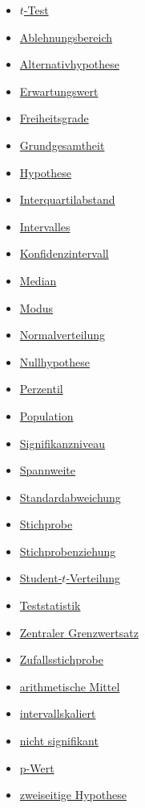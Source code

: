 \documentclass[
]{book}
\providecommand{\tightlist}{%
  \setlength{\itemsep}{0pt}\setlength{\parskip}{0pt}}
\theoremstyle{definition}
\theoremstyle{definition}
\theoremstyle{definition}
\theoremstyle{definition}
\theoremstyle{remark}
\begin{document}
\begin{itemize}
\tightlist
\item
  \hyperref[customdef-t-test]{\(t\)-Test}
\item
  \hyperref[customdef-ablehnungsbereich]{Ablehnungsbereich}
\item
  \hyperref[customdef-alternativhypothese]{Alternativhypothese}
\item
  \hyperref[customdef-erwartungswert]{Erwartungswert}
\item
  \hyperref[customdef-freiheitsgrade]{Freiheitsgrade}
\item
  \hyperref[customdef-grundgesamtheit]{Grundgesamtheit}
\item
  \hyperref[customdef-hypothese]{Hypothese}
\item
  \hyperref[customdef-iqr]{Interquartilabstand}
\item
  \hyperref[customdef-interval]{Intervalles}
\item
  \hyperref[customdef-confidence-interval]{Konfidenzintervall}
\item
  \hyperref[customdef-median]{Median}
\item
  \hyperref[customdef-modus]{Modus}
\item
  \hyperref[customdef-normalverteilung]{Normalverteilung}
\item
  \hyperref[customdef-nullhypothese]{Nullhypothese}
\item
  \hyperref[customdef-perzentil]{Perzentil}
\item
  \hyperref[customdef-population]{Population}
\item
  \hyperref[customdef-signifikanzniveau]{Signifikanzniveau}
\item
  \hyperref[customdef-spannweite]{Spannweite}
\item
  \hyperref[customdef-std]{Standardabweichung}
\item
  \hyperref[customdef-stichprobe]{Stichprobe}
\item
  \hyperref[customdef-stichprobenziehung]{Stichprobenziehung}
\item
  \hyperref[customdef-student-verteilung]{Student-\(t\)-Verteilung}
\item
  \hyperref[customdef-teststatistik]{Teststatistik}
\item
  \hyperref[customdef-zentraler-grenzwertsatz]{Zentraler Grenzwertsatz}
\item
  \hyperref[customdef-zufallsstichprobe]{Zufallsstichprobe}
\item
  \hyperref[customdef-arithmetisches-mittel]{arithmetische Mittel}
\item
  \hyperref[customdef-intervallskaliert]{intervallskaliert}
\item
  \hyperref[customdef-signifikanz]{nicht signifikant}
\item
  \hyperref[customdef-pwert]{p-Wert}
\item
  \hyperref[customdef-zweiseitige-hypothese]{zweiseitige Hypothese}
\end{itemize}
\end{document}
